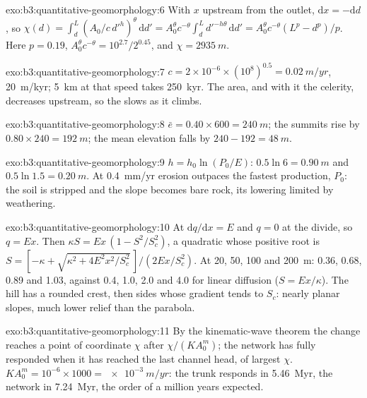 \begin{solution}{exo:b3:quantitative-geomorphology:6}
With $x$ upstream from the outlet, $\mathrm{d}x = -\mathrm{d}d$, so $\chi(d)
= \int_d^L (A_0/c\,d'^{h})^{\theta}\,\mathrm{d}d' = A_0^{\theta} c^{-\theta}
\int_d^L d'^{-h\theta}\,\mathrm{d}d' = A_0^{\theta}c^{-\theta}(L^p -
d^p)/p$. Here $p = 0.19$, $A_0^{\theta}c^{-\theta} = 10^{2.7}/2^{0.45}$,
and $\chi = \qty{2935}{m}$.
\end{solution}

\begin{solution}{exo:b3:quantitative-geomorphology:7}
$c = 2\times10^{-6}\times(10^8)^{0.5} = \qty{0.02}{m/yr}$, \qty{20}{m/kyr};
\qty{5}{km} at that speed takes \qty{250}{kyr}. The area, and with it the
celerity, decreases upstream, so the  slows as it climbs.
\end{solution}

\begin{solution}{exo:b3:quantitative-geomorphology:8}
$\bar e = 0.40\times600 = \qty{240}{m}$; the summits rise by $0.80\times240 =
\qty{192}{m}$; the mean elevation falls by $240 - 192 = \qty{48}{m}$.
\end{solution}

\begin{solution}{exo:b3:quantitative-geomorphology:9}
$h = h_0\ln(P_0/E)$: $0.5\ln 6 = \qty{0.90}{m}$ and $0.5\ln1.5 =
\qty{0.20}{m}$. At \qty{0.4}{mm/yr} erosion outpaces the fastest production,
$P_0$: the soil is stripped and the slope becomes bare rock, its lowering
limited by weathering.
\end{solution}

\begin{solution}{exo:b3:quantitative-geomorphology:10}
At  $\mathrm{d}q/\mathrm{d}x = E$ and $q = 0$ at the divide, so
$q = E x$. Then $\kappa S = E x\,(1 - S^2/S_c^2)$, a quadratic whose positive
root is $S = [-\kappa + \sqrt{\kappa^2 + 4E^2x^2/S_c^2}\,]/(2Ex/S_c^2)$. At
20, 50, 100 and \qty{200}{m}: 0.36, 0.68, 0.89 and 1.03, against 0.4, 1.0,
2.0 and 4.0 for linear diffusion ($S = Ex/\kappa$). The hill has a rounded
crest, then sides whose gradient tends to $S_c$: nearly planar slopes, much
lower relief than the parabola.
\end{solution}

\begin{solution}{exo:b3:quantitative-geomorphology:11}
By the kinematic-wave theorem the change reaches a point of coordinate
$\chi$ after $\chi/(KA_0^m)$; the network has fully responded when it has
reached the last channel head, of largest $\chi$. $K A_0^m = 10^{-6}\times
1000 = \qty{e-3}{m/yr}$: the trunk responds in \qty{5.46}{Myr}, the network
in \qty{7.24}{Myr}, the order of a million years expected.
\end{solution}

